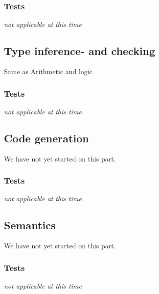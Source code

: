 \documentclass[11pt]{article}
\begin{document}
\subsubsection{Tests}
{\it not applicable at this time}%

\subsection{Type inference- and checking}
Same as Arithmetic and logic

\subsubsection{Tests}
{\it not applicable at this time}%

\subsection{Code generation}
We have not yet started on this part.

\subsubsection{Tests}%
{\it not applicable at this time}%

\subsection{Semantics}
We have not yet started on this part.

\subsubsection{Tests}
{\it not applicable at this time}%
\end{document}
